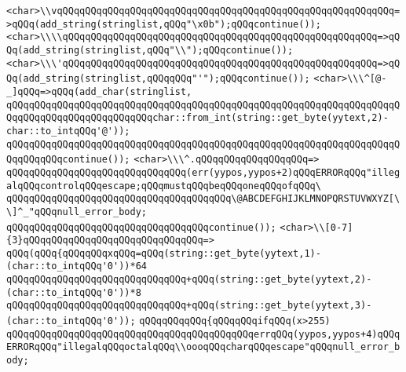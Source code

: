 \verb|<char>\\vqQQqqQQqqQQqqQQqqQQqqQQqqQQqqQQqqQQqqQQqqQQqqQQqqQQqqQQqqQQq=>qQQq(add_string(stringlist,qQQq"\x0b");qQQqcontinue());|\newline
\verb|<char>\\\\qQQqqQQqqQQqqQQqqQQqqQQqqQQqqQQqqQQqqQQqqQQqqQQqqQQqqQQq=>qQQq(add_string(stringlist,qQQq"\\");qQQqcontinue());|\newline
\verb|<char>\\\'qQQqqQQqqQQqqQQqqQQqqQQqqQQqqQQqqQQqqQQqqQQqqQQqqQQqqQQq=>qQQq(add_string(stringlist,qQQqqQQq"'");qQQqcontinue());|\newline
\verb|<char>\\\^[@-_]qQQq=>qQQq(add_char(stringlist,|\newline
\verb|qQQqqQQqqQQqqQQqqQQqqQQqqQQqqQQqqQQqqQQqqQQqqQQqqQQqqQQqqQQqqQQqqQQqqQQqqQQqqQQqqQQqqQQqqQQqqQQqchar::from_int(string::get_byte(yytext,2)-char::to_intqQQq'@'));|\newline
\verb|qQQqqQQqqQQqqQQqqQQqqQQqqQQqqQQqqQQqqQQqqQQqqQQqqQQqqQQqqQQqqQQqqQQqqQQqqQQqqQQqcontinue());|\newline
\verb|<char>\\\^.qQQqqQQqqQQqqQQqqQQq=>|\newline
\verb|qQQqqQQqqQQqqQQqqQQqqQQqqQQqqQQq(err(yypos,yypos+2)qQQqERRORqQQq"illegalqQQqcontrolqQQqescape;qQQqmustqQQqbeqQQqoneqQQqofqQQq\|\newline
\verb|qQQqqQQqqQQqqQQqqQQqqQQqqQQqqQQqqQQqqQQq\@ABCDEFGHIJKLMNOPQRSTUVWXYZ[\\]^_"qQQqnull_error_body;|\newline
\verb|qQQqqQQqqQQqqQQqqQQqqQQqqQQqqQQqqQQqcontinue());|\newline
\newline
\verb|<char>\\[0-7]{3}qQQqqQQqqQQqqQQqqQQqqQQqqQQqqQQq=>|\newline
\verb|qQQq(qQQq{qQQqqQQqxqQQq=qQQq(string::get_byte(yytext,1)-(char::to_intqQQq'0'))*64|\newline
\verb|qQQqqQQqqQQqqQQqqQQqqQQqqQQqqQQq+qQQq(string::get_byte(yytext,2)-(char::to_intqQQq'0'))*8|\newline
\verb|qQQqqQQqqQQqqQQqqQQqqQQqqQQqqQQq+qQQq(string::get_byte(yytext,3)-(char::to_intqQQq'0'));|\newline
\verb|qQQqqQQqqQQq{qQQqqQQqifqQQq(x>255)|\newline
\verb|qQQqqQQqqQQqqQQqqQQqqQQqqQQqqQQqqQQqqQQqqQQqerrqQQq(yypos,yypos+4)qQQqERRORqQQq"illegalqQQqoctalqQQq\\oooqQQqcharqQQqescape"qQQqnull_error_body;|\newline
